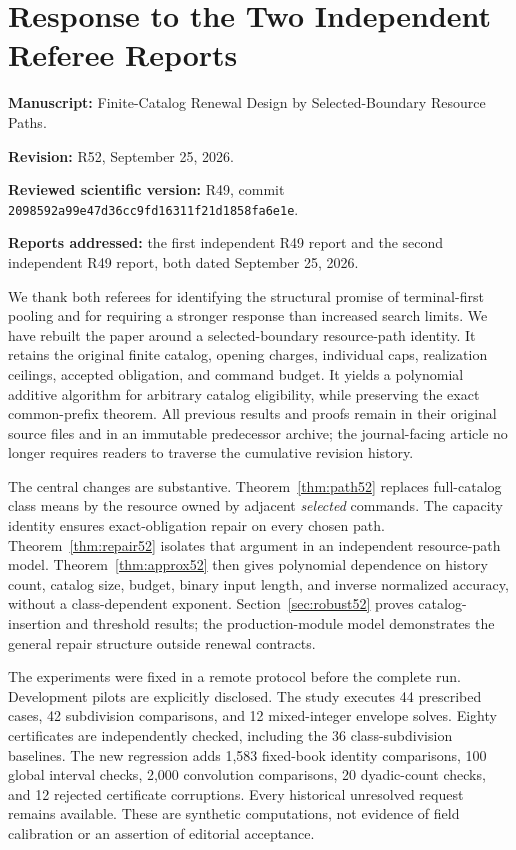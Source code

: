 \section*{Response to the Two Independent Referee Reports}
\noindent\textbf{Manuscript:} Finite-Catalog Renewal Design by Selected-Boundary Resource Paths.
\par\noindent\textbf{Revision:} R52, September 25, 2026.
\par\noindent\textbf{Reviewed scientific version:} R49, commit \texttt{2098592a99e47d36cc9fd16311f21d1858fa6e1e}.
\par\noindent\textbf{Reports addressed:} the first independent R49 report and the second independent R49 report, both dated September 25, 2026.

We thank both referees for identifying the structural promise of terminal-first pooling and for requiring a stronger response than increased search limits. We have rebuilt the paper around a selected-boundary resource-path identity. It retains the original finite catalog, opening charges, individual caps, realization ceilings, accepted obligation, and command budget. It yields a polynomial additive algorithm for arbitrary catalog eligibility, while preserving the exact common-prefix theorem. All previous results and proofs remain in their original source files and in an immutable predecessor archive; the journal-facing article no longer requires readers to traverse the cumulative revision history.

The central changes are substantive. Theorem~\ref{thm:path52} replaces full-catalog class means by the resource owned by adjacent \emph{selected} commands. The capacity identity ensures exact-obligation repair on every chosen path. Theorem~\ref{thm:repair52} isolates that argument in an independent resource-path model. Theorem~\ref{thm:approx52} then gives polynomial dependence on history count, catalog size, budget, binary input length, and inverse normalized accuracy, without a class-dependent exponent. Section~\ref{sec:robust52} proves catalog-insertion and threshold results; the production-module model demonstrates the general repair structure outside renewal contracts.

The experiments were fixed in a remote protocol before the complete run. Development pilots are explicitly disclosed. The study executes 44 prescribed cases, 42 subdivision comparisons, and 12 mixed-integer envelope solves. Eighty certificates are independently checked, including the 36 class-subdivision baselines. The new regression adds 1,583 fixed-book identity comparisons, 100 global interval checks, 2,000 convolution comparisons, 20 dyadic-count checks, and 12 rejected certificate corruptions. Every historical unresolved request remains available. These are synthetic computations, not evidence of field calibration or an assertion of editorial acceptance.

